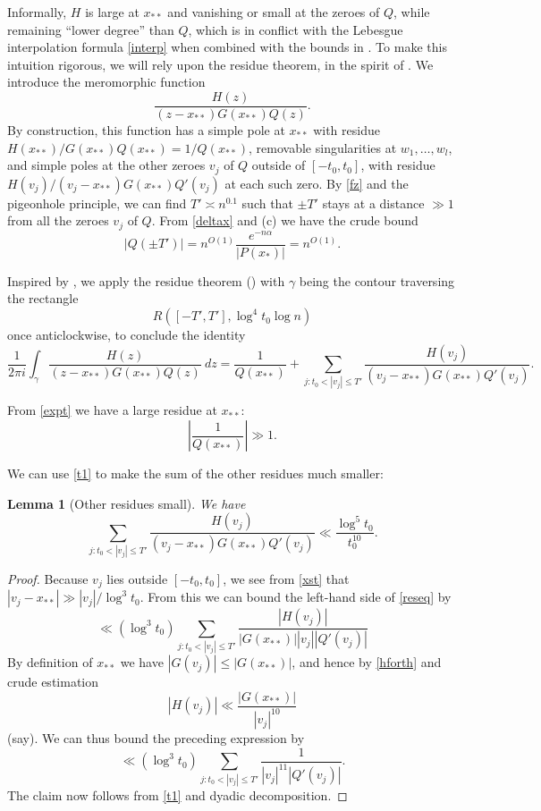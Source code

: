\documentclass[12pt]{amsart}
\newtheorem{lemma}[theorem]{Lemma}
\begin{document}
Informally, $H$ is large at $x_{**}$ and vanishing or small at the zeroes of $Q$, while remaining ``lower degree'' than $Q$, which is in conflict with the Lebesgue interpolation formula \eqref{interp} when combined with the bounds in .  To make this intuition rigorous, we will rely upon the residue theorem, in the spirit of .  We introduce the meromorphic function
$$\frac{H(z)}{(z-x_{**}) G(x_{**}) Q(z)}.$$
By construction, this function has a simple pole at $x_{**}$ with residue $H(x_{**})/G(x_{**}) Q(x_{**}) = 1 / Q(x_{**})$, removable singularities at $w_1,\dots,w_l$, and simple poles at the other zeroes $v_j$ of $Q$ outside of $[-t_0,t_0]$, with residue $H(v_j)/(v_j-x_{**}) G(x_{**}) Q'(v_j)$ at each such zero.  By \eqref{fz} and the pigeonhole principle, we can find $T' \asymp n^{0.1}$ such that $\pm T'$ stays at a distance $\gg 1$ from all the zeroes $v_j$ of $Q$.  From \eqref{deltax} and (c) we have the crude bound
\begin{equation}\label{fpt}
 |Q(\pm T')| = n^{O(1)} \frac{e^{-n\alpha} }{ |P(x_*)| }= n^{O(1)}.
\end{equation}

Inspired by , we apply the residue theorem () with $\gamma$ being the contour traversing the rectangle
$$ R([-T',T'], \log^4 t_0 \log n)$$
once anticlockwise, to conclude the identity
\begin{equation}\label{resident}
\frac{1}{2\pi i} \int_\gamma \frac{H(z)}{(z-x_{**}) G(x_{**}) Q(z)}\ dz =  \frac{1}{Q(x_{**})} + \sum_{j: t_0 < |v_j| \leq T'} \frac{H(v_j)}{(v_j - x_{**}) G(x_{**}) Q'(v_j)}.
\end{equation}

From \eqref{expt} we have a large residue at $x_{**}$:
\begin{equation}\label{ft}
 \left| \frac{1}{Q(x_{**})}\right| \gg 1.
\end{equation}

We can use \eqref{t1} to make the sum of the other residues much smaller:

\begin{lemma}[Other residues small]\label{ressum}  We have
\begin{equation}\label{reseq}
       \sum_{j: t_0 < |v_j| \leq T'} \frac{H(v_j)}{(v_j - x_{**}) G(x_{**}) Q'(v_j)}  \ll \frac{\log^5 t_0}{t_0^{10}}.
\end{equation}
\end{lemma}

\begin{proof}
Because $v_j$ lies outside $[-t_0,t_0]$, we see from \eqref{xst} that $|v_j - x_{**}| \gg |v_j|/\log^3 t_0$.  From this we can bound the left-hand side of \eqref{reseq} by
$$ \ll (\log^3 t_0) \sum_{j: t_0 < |v_j| \leq T'} \frac{|H(v_j)|}{|G(x_{**})| |v_j| |Q'(v_j)|} $$
By definition of $x_{**}$ we have $|G(v_j)| \leq |G(x_{**})|$, and hence by \eqref{hforth} and crude estimation
$$ |H(v_j)| \ll \frac{|G(x_{**})|}{|v_j|^{10}} $$
(say).  We can thus bound the preceding expression by
$$ \ll (\log^3 t_0) \sum_{j: t_0 < |v_j| \leq T'} \frac{1}{|v_j|^{11} |Q'(v_j)|}.$$
The claim now follows from \eqref{t1} and dyadic decomposition.
\end{proof}
\end{document}
